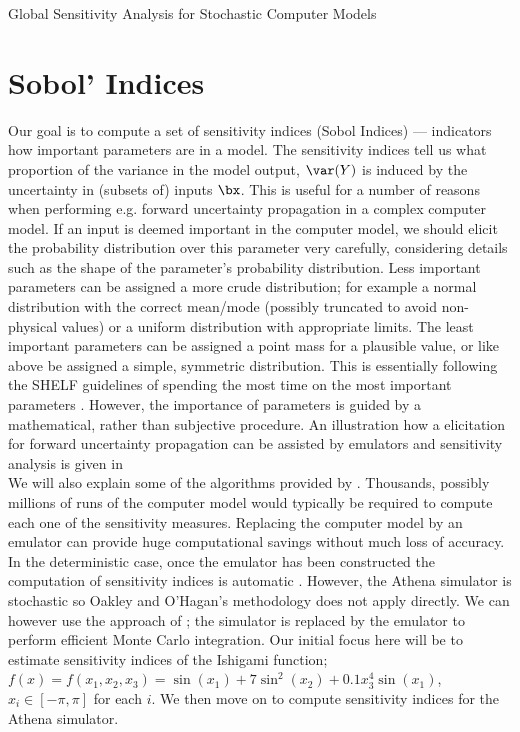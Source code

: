 \begin{chapter}{Global Sensitivity Analysis for Stochastic Computer Models}
\section{Sobol' Indices}

Our goal is to compute a set of sensitivity indices (Sobol Indices) --- indicators how important parameters are in a model. The sensitivity indices tell us what proportion of the variance in the model output, $\var(Y)$ is induced by the uncertainty in (subsets of) inputs $\bx$. This is useful for a number of reasons when performing e.g. forward uncertainty propagation in a complex computer model. If an input is deemed important in the computer model, we should elicit the probability distribution over this parameter very carefully, considering details such as the shape of the parameter's probability distribution. Less important parameters can be assigned a more crude distribution; for example a normal distribution with the correct mean/mode (possibly truncated to avoid non-physical values) or a uniform distribution with appropriate limits. The least important parameters can be assigned a point mass for a plausible value, or like above be assigned a simple, symmetric distribution. This is essentially following the SHELF guidelines of spending the most time on the most important parameters \citep{SHELF4}. However, the importance of parameters is guided by a mathematical, rather than subjective procedure. An illustration how a elicitation for forward uncertainty propagation can be assisted by emulators and sensitivity analysis is given in \\

We will also explain some of the algorithms provided by \citet{Sobol1993}. Thousands, possibly millions of runs of the computer model would typically be required to compute each one of the sensitivity measures. Replacing the computer model by an emulator can provide huge computational savings without much loss of accuracy. In the deterministic case, once the emulator has been constructed the computation of sensitivity indices is automatic \citep{Oakley04}. However, the Athena simulator is stochastic so Oakley and O'Hagan's methodology does not apply directly. We can however use the approach of \citet{Marrel2012}; the simulator is replaced by the emulator to perform efficient Monte Carlo integration. Our initial focus here will be to estimate sensitivity indices of the Ishigami function; $f(x) = f(x_1, x_2, x_3) = \sin(x_1) + 7 \sin^2(x_2) + 0.1 x_3^4 \sin(x_1)$, $x_i \in [-\pi, \pi]$ for each $i$. We then move on to compute sensitivity indices for the Athena simulator.\\


\end{chapter}
